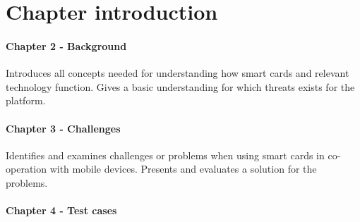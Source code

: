 \section{Chapter introduction}
\paragraph{Chapter 2 - Background}
Introduces all concepts needed for understanding how smart cards and relevant technology function. Gives a basic understanding for which threats exists for the platform.

\paragraph{Chapter 3 - Challenges}
Identifies and examines challenges or problems when using smart cards in co-operation with mobile devices. Presents and evaluates a solution for the problems.

\paragraph{Chapter 4 - Test cases}

